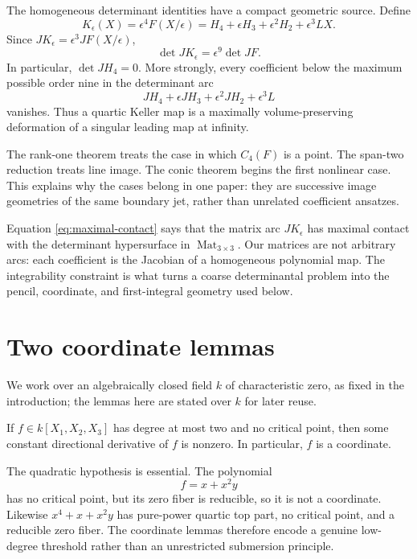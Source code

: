 \documentclass[11pt,reqno]{amsart}
\begin{document}
The homogeneous determinant identities have a compact geometric source.
Define
\[
K_\epsilon(X)
=\epsilon^4F(X/\epsilon)
=H_4+\epsilon H_3+\epsilon^2H_2+\epsilon^3LX.
\]
Since \(JK_\epsilon=\epsilon^3JF(X/\epsilon)\),
\begin{equation}
\label{eq:maximal-contact}
\det JK_\epsilon=\epsilon^9\det JF.
\end{equation}
In particular, \(\det JH_4=0\).  More strongly, every coefficient below
the maximum possible order nine in the determinant arc
\[
JH_4+\epsilon JH_3+\epsilon^2JH_2+\epsilon^3L
\]
vanishes.  Thus a quartic Keller map is a maximally volume-preserving
deformation of a singular leading map at infinity.

The rank-one theorem treats the case in which \(C_4(F)\) is a point.  The
span-two reduction treats line image.  The conic theorem begins the first
nonlinear case.  This explains why the cases belong in one paper: they are
successive image geometries of the same boundary jet, rather than unrelated
coefficient ansatzes.

\begin{remark}
Equation \eqref{eq:maximal-contact} says that the matrix arc \(JK_\epsilon\)
has maximal contact with the determinant hypersurface in
\(\operatorname{Mat}_{3\times3}\).  Our matrices are not arbitrary arcs:
each coefficient is the Jacobian of a homogeneous polynomial map.  The
integrability constraint is what turns a coarse determinantal problem into
the pencil, coordinate, and first-integral geometry used below.
\end{remark}

\section{Two coordinate lemmas}
\label{sec:coordinates}

We work over an algebraically closed field \(k\) of characteristic
zero, as fixed in the introduction; the lemmas here are stated over
\(k\) for later reuse.

\begin{lemma}
\label{lem:quadratic-coordinate}
If \(f\in k[X_1,X_2,X_3]\) has degree at most two and no critical point, then
some constant directional derivative of \(f\) is nonzero.  In particular,
\(f\) is a coordinate.
\end{lemma}

\begin{remark}
The quadratic hypothesis is essential.  The polynomial
\[
f=x+x^2y
\]
has no critical point, but its zero fiber is reducible, so it is not a
coordinate.  Likewise \(x^4+x+x^2y\) has pure-power quartic top part, no
critical point, and a reducible zero fiber.  The coordinate lemmas therefore
encode a genuine low-degree threshold rather than an unrestricted
submersion principle.
\end{remark}
\end{document}
